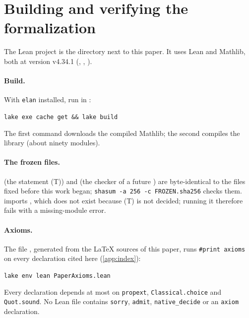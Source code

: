 \section{Building and verifying the formalization}\label{app:verify}

The Lean project is the directory  next to this paper. It uses Lean and Mathlib, both at version
v4.34.1 (, , ).

\paragraph{Build.} With \texttt{elan} installed, run in :
\begin{center}
\texttt{lake exe cache get \&\& lake build}
\end{center}
The first command downloads the compiled Mathlib; the second compiles the library (about ninety modules).

\paragraph{The frozen files.}  (the statement (T)) and  (the
checker of a future ) are byte-identical to the files fixed before this work began;
\texttt{shasum -a 256 -c FROZEN.sha256} checks them.  imports
, which does not exist because (T) is not decided; running it therefore fails with a
missing-module error.

\paragraph{Axioms.} The file , generated from the \LaTeX{} sources of this paper, runs
\texttt{\#print axioms} on every declaration cited here (\cref{app:index}):
\begin{center}
\texttt{lake env lean PaperAxioms.lean}
\end{center}
Every declaration depends at most on \texttt{propext}, \texttt{Classical.choice} and \texttt{Quot.sound}. No Lean file
contains \texttt{sorry}, \texttt{admit}, \texttt{native\_decide} or an \texttt{axiom} declaration.


